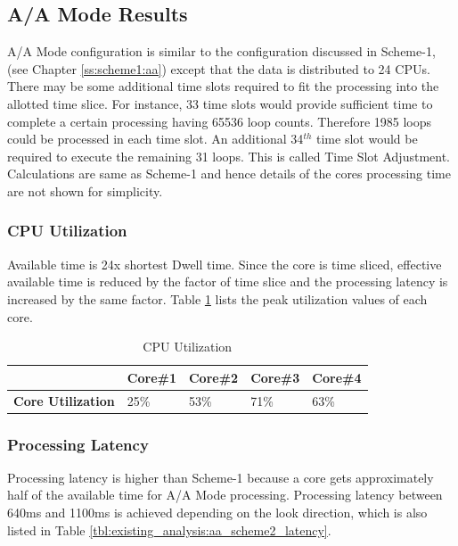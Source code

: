 \subsection{A/A Mode Results}
\label{ss:scheme2:aa}
A/A Mode configuration is similar to the configuration discussed in Scheme-1, (see Chapter \ref{ss:scheme1:aa}) except that the data is distributed to 24 CPUs. There may be some additional time slots required to fit the processing into the allotted time slice. For instance, 33 time slots would provide sufficient time to complete a certain processing having 65536 loop counts. Therefore 1985 loops could be processed in each time slot. An additional 34$^{th}$ time slot would be required to execute the remaining 31 loops. This is called Time Slot Adjustment. Calculations are same as Scheme-1 and hence details of the cores processing time are not shown for simplicity.

\subsubsection{CPU Utilization}
\label{sss:scheme2:cpu_util}
Available time is 24x shortest Dwell time. Since the core is time sliced, effective available time is reduced by the factor of time slice and the processing latency is increased by the same factor. Table \ref{tbl:existing_analysis:aa_scheme2_cpu_util} lists the peak utilization values of each core.

\begin{table}[h!]
	\centering
	\begin{tabular}{|l|l|l|l|l|} 
	 \hline
	 & \textbf{Core\#1} & \textbf{Core\#2} & \textbf{Core\#3} & \textbf{Core\#4} \\ \hline
	 \textbf{Core Utilization} & 25\% & 53\% & 71\% & 63\% \\ \hline
	\end{tabular}
	\caption{CPU Utilization}
	\label{tbl:existing_analysis:aa_scheme2_cpu_util}
\end{table}

\subsubsection{Processing Latency}
\label{sss:scheme2:latency}
Processing latency is higher than Scheme-1 because a core gets approximately half of the available time for A/A Mode processing. Processing latency between 640ms and 1100ms is achieved depending on the look direction, which is also listed in Table \ref{tbl:existing_analysis:aa_scheme2_latency}.

